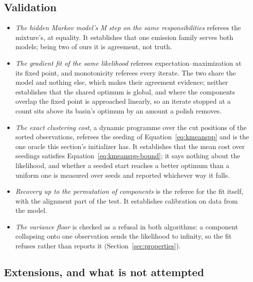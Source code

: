 \documentclass[11pt,a4paper]{article}
\begin{document}
\subsection{Validation}
\label{sec:mixture:validation}
\begin{itemize}
  \item \emph{The hidden Markov model's M step on the same responsibilities}
    referees the mixture's, at equality. It establishes that one emission
    family serves both models; being two of ours it is agreement, not truth.
  \item \emph{The gradient fit of the same likelihood} referees
    expectation--maximization at its fixed point, and monotonicity referees
    every iterate. The two share the model and nothing else, which makes their
    agreement evidence; neither establishes that the shared optimum is global,
    and where the components overlap the fixed point is approached linearly, so
    an iterate stopped at a count sits above its basin's optimum by an amount a
    polish removes.
  \item \emph{The exact clustering cost}, a dynamic programme over the cut
    positions of the sorted observations, referees the seeding of
    Equation~\ref{eq:kmeanspp} and is the one oracle this section's
    initializer has. It establishes that the mean cost over seedings satisfies
    Equation~\ref{eq:kmeanspp-bound}; it says nothing about the likelihood,
    and whether a seeded start reaches a better optimum than a uniform one is
    measured over seeds and reported whichever way it falls.
  \item \emph{Recovery up to the permutation of components} is the referee
    for the fit itself, with the alignment part of the test. It establishes
    calibration on data from the model.
  \item \emph{The variance floor} is checked as a refusal in both algorithms:
    a component collapsing onto one observation sends the likelihood to
    infinity, so the fit refuses rather than reports it
    (Section~\ref{sec:properties}).
\end{itemize}

\subsection{Extensions, and what is not attempted}
\label{sec:mixture:extensions}
\end{document}
